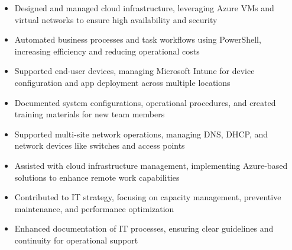 \par\smallskip
\noindent
\begin{minipage}{20cm}
  \begin{minipage}{9.75cm}
    \begin{itemize}
      \item Designed and managed cloud infrastructure, leveraging Azure VMs and virtual networks to ensure high availability and security
      \item Automated business processes and task workflows using PowerShell, increasing efficiency and reducing operational costs
    \end{itemize}
  \end{minipage}
  \hfill
  \begin{minipage}{9.75cm}
    \begin{itemize}
      \item Supported end-user devices, managing Microsoft Intune for device configuration and app deployment across multiple locations
      \item Documented system configurations, operational procedures, and created training materials for new team members
    \end{itemize}
  \end{minipage}
\end{minipage}
\par\smallskip
\divider

\par\smallskip
\noindent
\begin{minipage}{20cm}
  \begin{minipage}{9.75cm}
    \begin{itemize}
      \item Supported multi-site network operations, managing DNS, DHCP, and network devices like switches and access points
      \item Assisted with cloud infrastructure management, implementing Azure-based solutions to enhance remote work capabilities
    \end{itemize}
  \end{minipage}
  \hfill
  \begin{minipage}{9.75cm}
    \begin{itemize}
      \item Contributed to IT strategy, focusing on capacity management, preventive maintenance, and performance optimization
      \item Enhanced documentation of IT processes, ensuring clear guidelines and continuity for operational support
    \end{itemize}
  \end{minipage}
\end{minipage}

